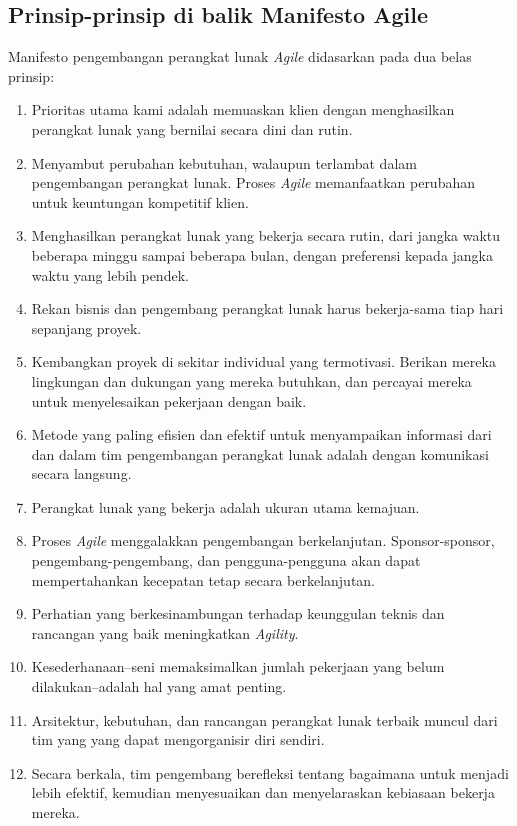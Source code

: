 \documentclass[a4paper, 12pt, oneside]{report}
\begin{document}
\subsection{Prinsip-prinsip di balik Manifesto Agile}
Manifesto pengembangan perangkat lunak \textit{Agile} didasarkan pada dua belas prinsip:
\begin{enumerate}
  \item Prioritas utama kami adalah memuaskan klien dengan menghasilkan perangkat lunak yang bernilai secara dini dan rutin.
  \item Menyambut perubahan kebutuhan, walaupun terlambat dalam pengembangan perangkat lunak. Proses \textit{Agile} memanfaatkan perubahan untuk keuntungan kompetitif klien.
  \item Menghasilkan perangkat lunak yang bekerja secara rutin, dari jangka waktu beberapa minggu sampai beberapa bulan, dengan preferensi kepada jangka waktu yang lebih pendek.
  \item Rekan bisnis dan pengembang perangkat lunak harus bekerja-sama tiap hari sepanjang proyek.
  \item Kembangkan proyek di sekitar individual yang termotivasi. Berikan mereka lingkungan dan dukungan yang mereka butuhkan, dan percayai mereka untuk menyelesaikan pekerjaan dengan baik.
  \item Metode yang paling efisien dan efektif untuk menyampaikan informasi dari dan dalam tim pengembangan perangkat lunak adalah dengan komunikasi secara langsung.
  \item Perangkat lunak yang bekerja adalah ukuran utama kemajuan.
  \item Proses \textit{Agile} menggalakkan pengembangan berkelanjutan. Sponsor-sponsor, pengembang-pengembang, dan pengguna-pengguna akan dapat mempertahankan kecepatan tetap secara berkelanjutan.
  \item Perhatian yang berkesinambungan terhadap keunggulan teknis dan rancangan yang baik meningkatkan \textit{Agility}.
  \item Kesederhanaan--seni memaksimalkan jumlah pekerjaan yang belum dilakukan--adalah hal yang amat penting.
  \item Arsitektur, kebutuhan, dan rancangan perangkat lunak terbaik muncul dari tim yang yang dapat mengorganisir diri sendiri.
  \item Secara berkala, tim pengembang berefleksi tentang bagaimana untuk menjadi lebih efektif, kemudian menyesuaikan dan menyelaraskan kebiasaan bekerja mereka.
\end{enumerate}
\end{document}
